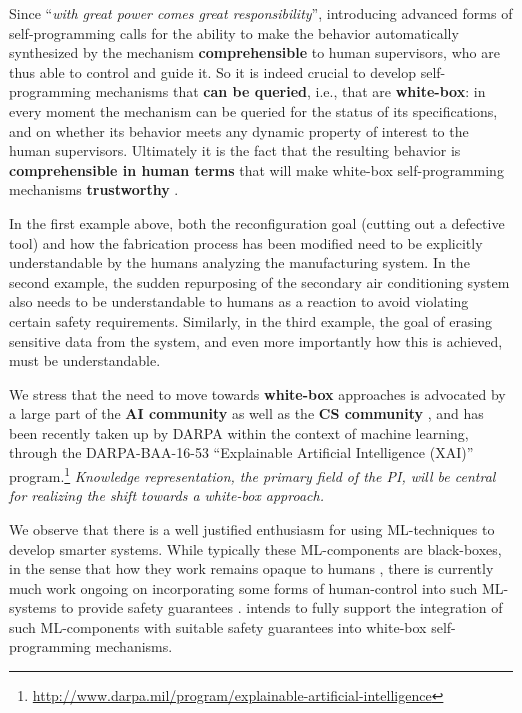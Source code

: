 Since ``\emph{with great power comes great responsibility}'',
introducing advanced forms of self-programming calls for the ability
to make the behavior automatically synthesized by the mechanism
\textbf{comprehensible} to human supervisors, who are thus able to control and guide it.
So it is indeed crucial to develop self-programming mechanisms that
\textbf{can be queried}, i.e.,  that are \textbf{white-box}: in every moment
the mechanism can be queried for the status of its specifications, 
and on whether its behavior meets any dynamic property of interest to
the human supervisors.
Ultimately it is the fact that the resulting behavior is
\textbf{comprehensible in human terms} that will make white-box
self-programming mechanisms \textbf{trustworthy}
\cite{CaDa10,Neumann17}.
%


In the first example above, both the reconfiguration goal (cutting out
a defective tool) and how the fabrication process has been modified
need to be explicitly understandable by the humans analyzing the
manufacturing system.
In the second example, the sudden repurposing of the secondary air conditioning
system also needs to be understandable to humans as a reaction to
avoid violating certain safety requirements.
Similarly, in the third example, the goal of erasing sensitive data
from the system, and even more importantly how this is achieved, must
be understandable.


We  stress that the need to move towards \textbf{white-box}
approaches is advocated by a large part of the \textbf{AI community}
\cite{RussellDT15} as well as the \textbf{CS community} \cite{ACMStatement07}, and has been recently taken up by DARPA within the
context of machine learning, through the DARPA-BAA-16-53 ``Explainable
Artificial Intelligence (XAI)''
program.\footnote{\url{http://www.darpa.mil/program/explainable-artificial-intelligence}}
\emph{Knowledge representation, the primary field of the PI, will be central for realizing the shift towards a white-box approach.}


We observe that there is a well justified enthusiasm for using ML-techniques
to develop smarter systems.  
%
While typically these ML-components are
black-boxes, in the sense that how they work remains opaque to humans
\cite{MnihKSGAWR13,SilverHMGSDSAPL16},
%
there is currently much work ongoing on incorporating some forms of
human-control into such ML-systems to provide safety guarantees
\cite{AmodeiOSCSM16,TYLC16,Hadfield-Menell16a}. 
%
\project  intends to fully support the integration
of such ML-components with suitable safety guarantees into white-box
self-programming mechanisms.



